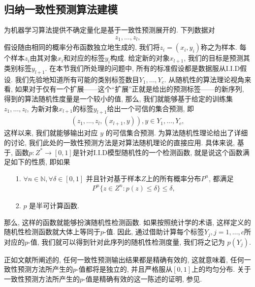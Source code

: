 \subsection{归纳一致性预测算法建模}
\label{ICP}
为机器学习算法提供不确定量化是基于一致性预测展开的\citep{vovk2005algorithmic,2006Hedging,shafer08a}. 下列数据对
\begin{align*}
z_1,\ldots,z_l,
\end{align*}
假设随由相同的概率分布函数独立地生成的, 我们将$z_i = (x_i,y_i)$称之为\textsf{样本}. 每个样本$z_i$由其对象$x_{i}$和对应的标签$y_{i}$构成. 给定新的对象$x_{l+1}$, 我们的目标是预测其类别标签$y_{l+1}$. 在本节我们所处理的问题中, 所有的标准假设都是数据服从I.I.D假设. 我们先验地知道所有可能的类别标签数目$Y_1,\ldots,Y_{c}$. 从随机性的算法理论视角来看, 如果对于仅有一个扩展——这个“扩展”正就是给出的预测标签——的新序列, 得到的算法随机性度量是一个较小的值, 那么, 我们就能够基于给定的训练集$z_1,\ldots,z_{l}$, 为新对象$x_{l+1}$的标签$y_{l+1}$给出一个可信的集合预测, 即
\begin{align*}
(z_1,\ldots,z_{l},(x_{l+1},y)),y \in {Y_1,\ldots,Y_c},
\end{align*}
这样以来, 我们就能够输出对应 $y$ 的可信集合预测. \citet{Kolmogorov1963,MartinLf1966,Kolmogorov1968,Kolmogorov1983,Li2008} 为算法随机性理论给出了详细的讨论, 我们此处的一致性预测方法是对算法随机理论的直接应用. 具体来说, 基于\citet{MartinLf1966}, 函数$p: Z^{*} \rightarrow [0,1]$是针对I.I.D模型随机性的一个检测函数, 就是说这个函数满足如下的性质, 即如果
\begin{enumerate}
\item[1.] $\forall n \in \mathbb{N}, \forall \delta \in [0,1]$ 并且针对基于样本$Z$上的所有概率分布$P^{n}$, 都满足
\begin{align}
P^{n}\{z \in Z^{n}: p(z) \leq \delta \} \leq \delta,
\end{align}
\item[2.] $p$ 是半可计算函数.
\end{enumerate}
那么, 这样的函数就能够扮演随机性检测函数. 如果按照统计学的术语, 这样定义的随机性检测函数就大体上等同于$p$-值. 因此, 通过借助计算每个标签$Y_{j},j=1,\ldots,c$所对应的$p$-值, 我们就可以得到针对此序列的随机性检测度量, 我们将之记为 $p(Y_{j})$.

正如文献\citet{vovk2005algorithmic}所阐述的, 任何一致性预测输出结果都是精确有效的, 这就意味着, 任何一致性预测方法所产生的$p$-值都将是独立的, 并且严格服从$[0,1]$上的均匀分布. 关于一致性预测方法所产生的$p$-值是精确有效的这一陈述的证明, 参见\citet{vovk2005algorithmic}.

